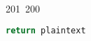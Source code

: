 201~200~\documentclass{article}
\begin{document}
\begin{lstlisting}[language=Python, caption=Decrypting a Message with ChaCha20-Poly1305]
	                                                                                                                                                                                                                                                                                                	                                                                                                                                        	    	                                                                                                	                                                                                                                                                                                                                                                                                                                                	                                                                        	                                                                        	                                                                                                                                        	                                                                                                                                                                                                                        	                                                                                                                            	                                                                	                                                                                                                                                                                    return plaintext

\end{lstlisting}
\end{document}
